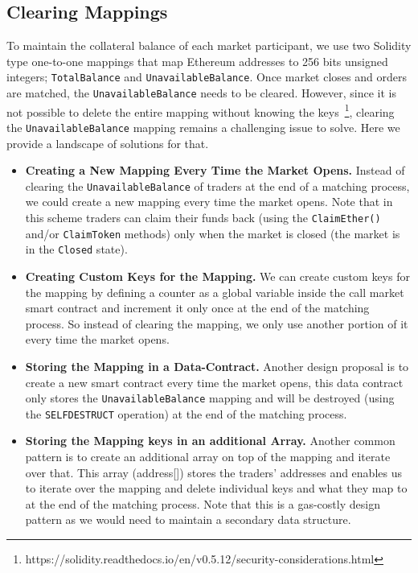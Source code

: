 \subsection{Clearing Mappings}

To maintain the collateral balance of each market participant, we use two Solidity type one-to-one mappings that map Ethereum addresses to 256 bits unsigned integers; \texttt{TotalBalance} and \texttt{UnavailableBalance}. Once market closes and orders are matched, the \texttt{UnavailableBalance} needs to be cleared. However, since it is not possible to delete the entire mapping without knowing the keys~\footnote{https://solidity.readthedocs.io/en/v0.5.12/security-considerations.html}, clearing the \texttt{UnavailableBalance} mapping remains a challenging issue to solve. Here we provide a landscape of solutions for that.

\begin{itemize}

\item \textbf{Creating a New Mapping Every Time the Market Opens.} Instead of clearing the \texttt{UnavailableBalance} of traders at the end of a matching process, we could create a new mapping every time the market opens. Note that in this scheme traders can claim their funds back (using the \texttt{ClaimEther()} and/or \texttt{ClaimToken} methods) only when the market is closed (\ie the market is in the \texttt{Closed} state).

\item \textbf{Creating Custom Keys for the Mapping.} We can create custom keys for the mapping by defining a counter as a global variable inside the call market smart contract and increment it only once at the end of the matching process. So instead of clearing the mapping, we only use another portion of it every time the market opens.

\item \textbf{Storing the Mapping in a Data-Contract.} Another design proposal is to create a new smart contract every time the market opens, this data contract only stores the \texttt{UnavailableBalance} mapping and will be destroyed (using the \texttt{SELFDESTRUCT} operation) at the end of the matching process.

\item \textbf{Storing the Mapping keys in an additional Array.} Another common pattern is to create an additional array on top of the mapping and iterate over that. This array (\eg address[]) stores the traders' addresses and enables us to iterate over the mapping and delete individual keys and what they map to at the end of the matching process. Note that this is a gas-costly design pattern as we would need to maintain a secondary data structure. 

\end{itemize}

